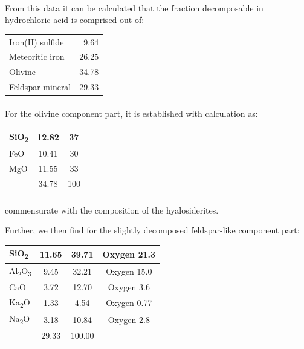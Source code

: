 \documentclass[a4paper, 12pt, oneside]{article}
\begin{document}
\paragraph*{}
From this data it can be calculated that the fraction decomposable in hydrochloric acid is comprised out of:
\begin{center}
    \begin{tabular}{l r}
        Iron(II) sulfide & 9.64\\
        Meteoritic iron & 26.25\\
        Olivine & 34.78\\
        Feldspar mineral & 29.33\\
    \end{tabular}
\end{center}
\paragraph*{}
For the olivine component part, it is established with calculation as:
\begin{center}
    \begin{tabular}{ |l|c|c| }
        \hline
        SiO\textsubscript{2} & 12.82 & 37\\\hline
        FeO & 10.41 & 30\\\hline
        MgO & 11.55 & 33\\\hline
         & 34.78 & 100\\
        \hline
    \end{tabular}
\end{center}
\paragraph*{}
commensurate with the composition of the hyalosiderites.

Further, we then find for the slightly decomposed feldspar-like component part:
\begin{center}
    \begin{tabular}{ |l|c|c|c| }
        \hline
        SiO\textsubscript{2} & 11.65 & 39.71 & Oxygen 21.3\\\hline
        Al\textsubscript{2}O\textsubscript{3} & 9.45 & 32.21 & Oxygen 15.0\\\hline
        CaO & 3.72 & 12.70 & Oxygen 3.6\\\hline
        Ka\textsubscript{2}O & 1.33 & 4.54 & Oxygen 0.77\\\hline
        Na\textsubscript{2}O & 3.18 & 10.84 & Oxygen 2.8\\\hline
         & 29.33 & 100.00 & \\
        \hline
    \end{tabular}
\end{center}
\end{document}
